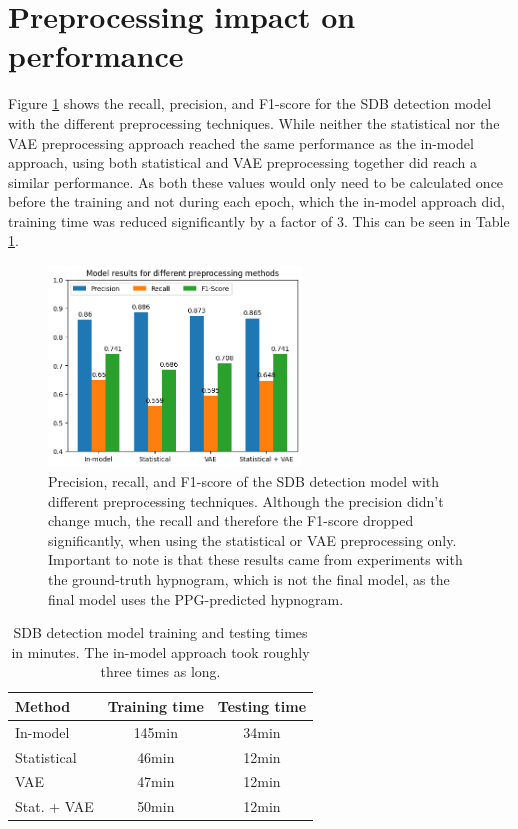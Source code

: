 \section{Preprocessing impact on performance}

Figure \ref{fig:preprocessingresults} shows the recall, precision, and F1-score for the SDB detection model with the different preprocessing techniques. While neither the statistical nor the VAE preprocessing approach reached the same performance as the in-model approach, using both statistical and VAE preprocessing together did reach a similar performance. As both these values would only need to be calculated once before the training and not during each epoch, which the in-model approach did, training time was reduced significantly by a factor of 3. This can be seen in Table \ref{tab:preprocessing-times}.

\begin{figure}
    \centering
    \includegraphics[width=0.6\textwidth]{images/PreprocessingResults}
    \caption{Precision, recall, and F1-score of the SDB detection model with different preprocessing techniques. Although the precision didn't change much, the recall and therefore the F1-score dropped significantly, when using the statistical or VAE preprocessing only.
    Important to note is that these results came from experiments with the ground-truth hypnogram, which is not the final model, as the final model uses the PPG-predicted hypnogram.}
    \label{fig:preprocessingresults}
\end{figure}

\renewcommand{\arraystretch}{1.5}
\begin{table}
    \centering
    \begin{tabular}{ l c c }
        Method & Training time & Testing time \\
        \hline
        In-model & 145min & 34min \\
        Statistical & 46min & 12min \\
        VAE & 47min & 12min \\
        Stat. + VAE & 50min & 12min \\
    \end{tabular}
    \caption{SDB detection model training and testing times in minutes. The in-model approach took roughly three times as long. \label{tab:preprocessing-times}}
\end{table}

